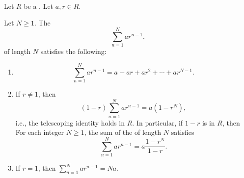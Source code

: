 \begin{proposition} \label{proposition:sum_formula_for_a_finite_geometric_series_over_a_commutative_ring}
    Let $R$ be a . Let $a, r \in R$. 

    Let $N \geq 1$. The 
    $$\sum_{n=1}^N ar^{n-1}.$$
    of length $N$ satisfies the following:
    \begin{enumerate}
        \item 
        $$\sum_{n=1}^N ar^{n-1} = a + ar + ar^2 + \cdots + ar^{N-1}.$$

        \item 
        If $r \neq 1$, then
        $$(1-r)\sum_{n=1}^N ar^{n-1} = a(1-r^N),$$
        i.e., the telescoping identity holds in $R$. In particular, if $1-r$ is  in $R$, then
        For each integer $N \geq 1$, the sum of the  of length $N$ satisfies
        $$\sum_{n=1}^N ar^{n-1} = a\frac{1-r^N}{1-r}.$$

        \item 
        If $r = 1$, then $\sum_{n=1}^N ar^{n-1} = Na$.
    \end{enumerate}
\end{proposition}
